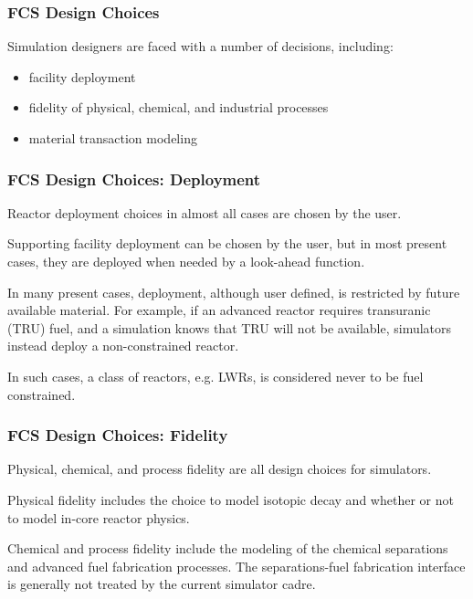 \begin{frame}[ctb!]
  \frametitle{FCS Design Choices}
  Simulation designers are faced with a number of decisions, including:
  \begin{itemize}
    \item facility deployment
    \item fidelity of physical, chemical, and industrial processes
    \item material transaction modeling
  \end{itemize}
\end{frame}

\begin{frame}[ctb!]
  \frametitle{FCS Design Choices: Deployment}

  Reactor deployment choices in almost all cases are chosen by the user.\vspace{0.2cm}

  Supporting facility deployment can be chosen by the user, but in most present
  cases, they are deployed when needed by a look-ahead function.\vspace{0.2cm}

  In many present cases, deployment, although user defined, is restricted by
  future available material. For example, if an advanced reactor requires
  transuranic (TRU) fuel, and a simulation knows that TRU will not be available,
  simulators instead deploy a non-constrained reactor.\vspace{0.2cm}

  In such cases, a class of reactors, e.g. LWRs, is considered never to be
  fuel constrained.
\end{frame}

\begin{frame}[ctb!]
  \frametitle{FCS Design Choices: Fidelity}

  Physical, chemical, and process fidelity are all design choices for simulators.\vspace{0.2cm}

  Physical fidelity includes the choice to model isotopic decay and whether or
  not to model in-core reactor physics.\vspace{0.2cm}

  Chemical and process fidelity include the modeling of the chemical separations
  and advanced fuel fabrication processes. The separations-fuel fabrication
  interface is generally not treated by the current simulator cadre.
\end{frame}


